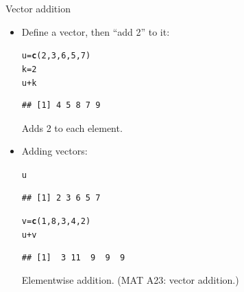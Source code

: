 \documentclass[unknownkeysallowed]{beamer}\usepackage[]{graphicx}\usepackage[]{color}
\makeatletter
\newcommand{\hlnum}[1]{\textcolor[rgb]{0.686,0.059,0.569}{#1}}%
\newcommand{\hlopt}[1]{\textcolor[rgb]{0,0,0}{#1}}%
\newcommand{\hlstd}[1]{\textcolor[rgb]{0.345,0.345,0.345}{#1}}%
\newcommand{\hlkwb}[1]{\textcolor[rgb]{0.69,0.353,0.396}{#1}}%
\newcommand{\hlkwd}[1]{\textcolor[rgb]{0.737,0.353,0.396}{\textbf{#1}}}%
\newenvironment{kframe}{%
 \def\at@end@of@kframe{}%
 \ifinner\ifhmode%
  \def\at@end@of@kframe{\end{minipage}}%
  \begin{minipage}{\columnwidth}%
 \fi\fi%
 \def\FrameCommand##1{\hskip\@totalleftmargin \hskip-\fboxsep
 \colorbox{shadecolor}{##1}\hskip-\fboxsep
     \hskip-\linewidth \hskip-\@totalleftmargin \hskip\columnwidth}%
 \MakeFramed {\advance\hsize-\width
   \@totalleftmargin\z@ \linewidth\hsize
   \@setminipage}}%
 {\par\unskip\endMakeFramed%
 \at@end@of@kframe}
\newenvironment{knitrout}{}{} %
\makeatother
\begin{document}
\begin{frame}[fragile]{Vector addition}

  \begin{itemize}
  \item Define a vector, then ``add 2'' to it:
\begin{knitrout}
\color{fgcolor}\begin{kframe}
\begin{alltt}
\hlstd{u}\hlkwb{=}\hlkwd{c}\hlstd{(}\hlnum{2}\hlstd{,}\hlnum{3}\hlstd{,}\hlnum{6}\hlstd{,}\hlnum{5}\hlstd{,}\hlnum{7}\hlstd{)}
\hlstd{k}\hlkwb{=}\hlnum{2}
\hlstd{u}\hlopt{+}\hlstd{k}
\end{alltt}
\begin{verbatim}
## [1] 4 5 8 7 9
\end{verbatim}
\end{kframe}
\end{knitrout}
Adds 2 to each element.
\item Adding vectors:
\begin{knitrout}
\color{fgcolor}\begin{kframe}
\begin{alltt}
\hlstd{u}
\end{alltt}
\begin{verbatim}
## [1] 2 3 6 5 7
\end{verbatim}
\begin{alltt}
\hlstd{v}\hlkwb{=}\hlkwd{c}\hlstd{(}\hlnum{1}\hlstd{,}\hlnum{8}\hlstd{,}\hlnum{3}\hlstd{,}\hlnum{4}\hlstd{,}\hlnum{2}\hlstd{)}
\hlstd{u}\hlopt{+}\hlstd{v}
\end{alltt}
\begin{verbatim}
## [1]  3 11  9  9  9
\end{verbatim}
\end{kframe}
\end{knitrout}
Elementwise addition. (MAT A23: vector addition.)
  \end{itemize}
  
\end{frame}
\end{document}
